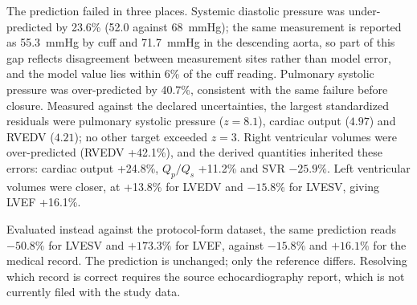 The prediction failed in three places. Systemic diastolic pressure was under-predicted by 23.6\% (52.0 against 68~mmHg); the same measurement is reported as 55.3~mmHg by cuff and 71.7~mmHg in the descending aorta, so part of this gap reflects disagreement between measurement sites rather than model error, and the model value lies within 6\% of the cuff reading. Pulmonary systolic pressure was over-predicted by 40.7\%, consistent with the same failure before closure. Measured against the declared uncertainties, the largest standardized residuals were pulmonary systolic pressure ($z = 8.1$), cardiac output ($4.97$) and RVEDV ($4.21$); no other target exceeded $z = 3$. Right ventricular volumes were over-predicted (RVEDV +42.1\%), and the derived quantities inherited these errors: cardiac output +24.8\%, $Q_p/Q_s$ +11.2\% and SVR $-25.9\%$. Left ventricular volumes were closer, at +13.8\% for LVEDV and $-15.8\%$ for LVESV, giving LVEF +16.1\%.

Evaluated instead against the protocol-form dataset, the same prediction reads $-50.8\%$ for LVESV and $+173.3\%$ for LVEF, against $-15.8\%$ and $+16.1\%$ for the medical record. The prediction is unchanged; only the reference differs. Resolving which record is correct requires the source echocardiography report, which is not currently filed with the study data.

